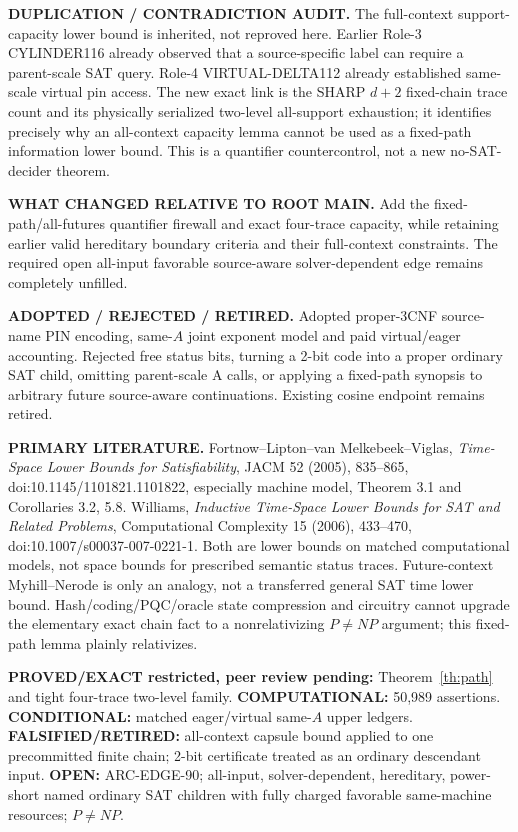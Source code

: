 \documentclass[11pt]{article}
\begin{document}
\textbf{DUPLICATION / CONTRADICTION AUDIT.}
The full-context support-capacity lower bound is inherited, not
reproved here. Earlier Role-3 CYLINDER116 already observed that a
source-specific label can require a parent-scale SAT query. Role-4
VIRTUAL-DELTA112 already established same-scale virtual pin access.
The new exact link is the SHARP $d+2$ fixed-chain trace count and
its physically serialized two-level all-support exhaustion; it
identifies precisely why an all-context capacity lemma cannot
be used as a fixed-path information lower bound. This is a
quantifier countercontrol, not a new no-SAT-decider theorem.

\textbf{WHAT CHANGED RELATIVE TO ROOT MAIN.} Add the
fixed-path/all-futures quantifier firewall and exact four-trace
capacity, while retaining earlier valid hereditary boundary
criteria and their full-context constraints. The required open
all-input favorable source-aware solver-dependent edge remains
completely unfilled.

\textbf{ADOPTED / REJECTED / RETIRED.} Adopted proper-3CNF
source-name PIN encoding, same-$A$ joint exponent model and paid
virtual/eager accounting. Rejected free status bits, turning a
2-bit code into a proper ordinary SAT child, omitting parent-scale
A calls, or applying a fixed-path synopsis to arbitrary future
source-aware continuations. Existing cosine endpoint remains retired.

\textbf{PRIMARY LITERATURE.} Fortnow--Lipton--van Melkebeek--Viglas,
\emph{Time-Space Lower Bounds for Satisfiability}, JACM 52 (2005),
835--865, doi:10.1145/1101821.1101822, especially machine model,
Theorem 3.1 and Corollaries 3.2, 5.8. Williams,
\emph{Inductive Time-Space Lower Bounds for SAT and Related Problems},
Computational Complexity 15 (2006), 433--470,
doi:10.1007/s00037-007-0221-1. Both are lower bounds on
matched computational models, not space bounds for prescribed
semantic status traces. Future-context Myhill--Nerode is only an
analogy, not a transferred general SAT time lower bound.
Hash/coding/PQC/oracle state compression and circuitry cannot
upgrade the elementary exact chain fact to a nonrelativizing
$P\ne NP$ argument; this fixed-path lemma plainly relativizes.

\textbf{PROVED/EXACT restricted, peer review pending:} Theorem~\ref{th:path}
and tight four-trace two-level family. \textbf{COMPUTATIONAL:} 50,989
assertions. \textbf{CONDITIONAL:} matched eager/virtual same-$A$
upper ledgers. \textbf{FALSIFIED/RETIRED:} all-context capsule bound
applied to one precommitted finite chain; 2-bit certificate treated
as an ordinary descendant input. \textbf{OPEN:} ARC-EDGE-90;
all-input, solver-dependent, hereditary, power-short named ordinary
SAT children with fully charged favorable same-machine resources;
$P\ne NP$.
\end{document}
